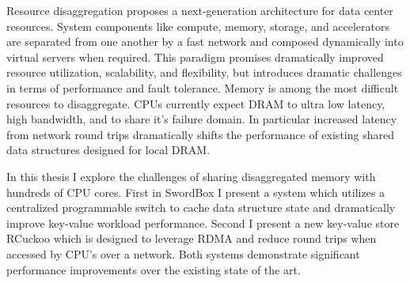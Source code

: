 \documentclass[12pt]{ucsddissertation}
\newcommand{\sword}{SwordBox}
\begin{document}
\begin{dissertationabstract} 
Resource disaggregation proposes a next-generation architecture for data center resources. System
components like compute, memory, storage, and accelerators are separated from one another by a fast
network and composed dynamically into virtual servers when required. This paradigm promises
dramatically improved resource utilization, scalability, and flexibility, but introduces dramatic
challenges in terms of performance and fault tolerance. Memory is among the most difficult resources
to disaggregate. CPUs currently expect DRAM to ultra low latency, high bandwidth, and to share it's
failure domain. In particular increased latency from network round trips dramatically shifts the
performance of existing shared data structures designed for local DRAM.

In this thesis I explore the challenges of sharing disaggregated memory with hundreds of CPU cores.
First in {\sword} I present a system which utilizes a centralized programmable switch to cache data
structure state and dramatically improve key-value workload performance. Second I present a new
key-value store RCuckoo which is designed to leverage RDMA and reduce round trips when accessed by
CPU's over a network. Both systems demonstrate significant performance improvements over the
existing state of the art.

\end{dissertationabstract}

\mainmatter
\end{document}
